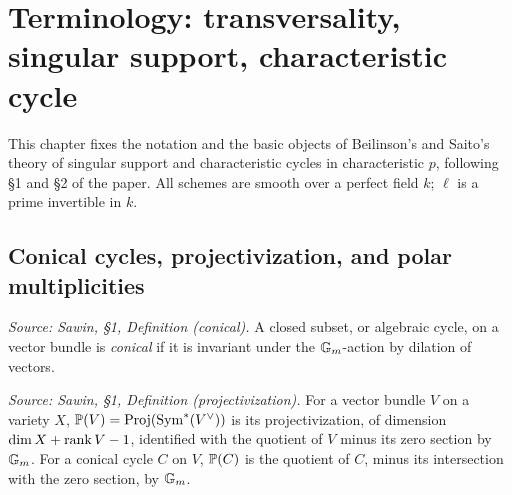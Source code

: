 \section{Terminology: transversality, singular support, characteristic cycle}


This chapter fixes the notation and the basic objects of Beilinson's and Saito's
theory of singular support and characteristic cycles in characteristic $p$,
following §1 and §2 of the paper.  All schemes are smooth over a perfect field
$k$; $\ell$ is a prime invertible in $k$.

\subsection{Conical cycles, projectivization, and polar multiplicities}

\begin{definition}
  \label{def:sawin_conical}
  \textit{Source: Sawin, §1, Definition (conical).}
  A closed subset, or algebraic cycle, on a vector bundle is \emph{conical} if it
  is invariant under the $\mathbb{G}_m$-action by dilation of vectors.
\end{definition}

\begin{definition}
  \label{def:sawin_projectivization}
  \textit{Source: Sawin, §1, Definition (projectivization).}
  For a vector bundle $V$ on a variety $X$, $\mathbb{P}(V) = \operatorname{Proj}(\operatorname{Sym}^*(V^\vee))$ is
  its projectivization, of dimension $\dim X + \operatorname{rank} V - 1$, identified with the
  quotient of $V$ minus its zero section by $\mathbb{G}_m$.  For a conical cycle $C$ on
  $V$, $\mathbb{P}(C)$ is the quotient of $C$, minus its intersection with the zero
  section, by $\mathbb{G}_m$.
\end{definition}

